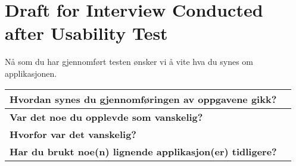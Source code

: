 \chapter{Draft for Interview Conducted after Usability Test}
\label{app:interviewafter}

N\r{a} som du har gjennomf\o rt testen \o nsker vi \r{a} vite hva du synes om applikasjonen.
\begin{center}
	\begin{tabular}{ | p{5.0cm} | p{10.0cm} | }
	\hline
	\textbf{Hvordan synes du gjennomf\o ringen av oppgavene gikk?} & \\[5ex]  \hline
	\textbf{Var det noe du opplevde som vanskelig?} & \\[5ex] \hline
	\textbf{Hvorfor var det vanskelig?} & \\[5ex]  \hline
	\textbf{Har du brukt noe(n) lignende applikasjon(er) tidligere?} & \\[5ex] \hline
	\end{tabular}
\end{center}